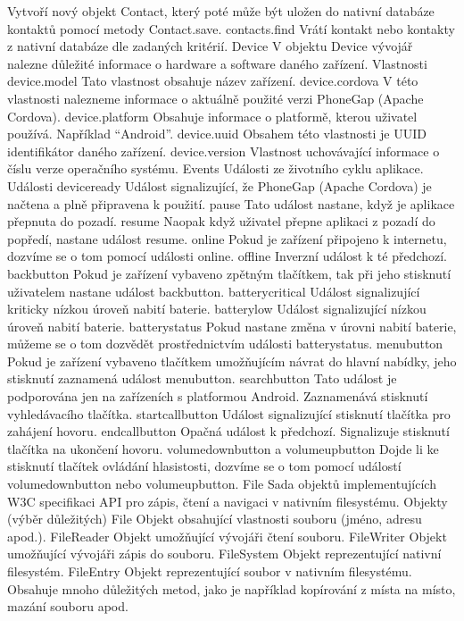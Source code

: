 Vytvoří nový objekt Contact, který poté může být uložen do nativní databáze kontaktů pomocí metody Contact.save.
contacts.find
Vrátí kontakt nebo kontakty z nativní databáze dle zadaných kritérií.
Device
V objektu Device vývojář nalezne důležité informace o hardware a software daného zařízení.
Vlastnosti
device.model
Tato vlastnost obsahuje název zařízení.
device.cordova
V této vlastnosti nalezneme informace o aktuálně použité verzi PhoneGap (Apache Cordova).
device.platform
Obsahuje informace o platformě, kterou uživatel používá. Například “Android”.
device.uuid
Obsahem této vlastnosti je UUID identifikátor daného zařízení.
device.version
Vlastnost uchovávající informace o číslu verze operačního systému.
Events
Události ze životního cyklu aplikace.
Události
deviceready
Událost signalizující, že PhoneGap (Apache Cordova) je načtena a plně připravena k použití.
pause
Tato událost nastane, když je aplikace přepnuta do pozadí.
resume
Naopak když uživatel přepne aplikaci z pozadí do popředí, nastane událost resume.
online
Pokud je zařízení připojeno k internetu, dozvíme se o tom pomocí události online.
offline
Inverzní událost k té předchozí.
backbutton
Pokud je zařízení vybaveno zpětným tlačítkem, tak při jeho stisknutí uživatelem nastane událost backbutton.
batterycritical
Událost signalizující kriticky nízkou úroveň nabití baterie.
batterylow
Událost signalizující nízkou úroveň nabití baterie.
batterystatus
Pokud nastane změna v úrovni nabití baterie, můžeme se o tom dozvědět prostřednictvím události batterystatus.
menubutton
Pokud je zařízení vybaveno tlačítkem umožňujícím návrat do hlavní nabídky, jeho stisknutí zaznamená událost menubutton.
searchbutton
Tato událost je podporována jen na zařízeních s platformou Android. Zaznamenává stisknutí vyhledávacího tlačítka.
startcallbutton
Událost signalizující stisknutí tlačítka pro zahájení hovoru.
endcallbutton
Opačná událost k předchozí. Signalizuje stisknutí tlačítka na ukončení hovoru.
volumedownbutton a volumeupbutton
Dojde li ke stisknutí tlačítek ovládání hlasistosti, dozvíme se o tom pomocí událostí volumedownbutton nebo volumeupbutton.
File
Sada objektů implementujících W3C specifikaci API pro zápis, čtení a navigaci v nativním filesystému.
Objekty (výběr důležitých)
File
Objekt obsahující vlastnosti souboru (jméno, adresu apod.).
FileReader
Objekt umožňující vývojáři čtení souboru.
FileWriter
Objekt umožňující vývojáři zápis do souboru.
FileSystem
Objekt reprezentující nativní filesystém.
FileEntry
Objekt reprezentující soubor v nativním filesystému. Obsahuje mnoho důležitých metod, jako je například kopírování z místa na místo, mazání souboru apod.

